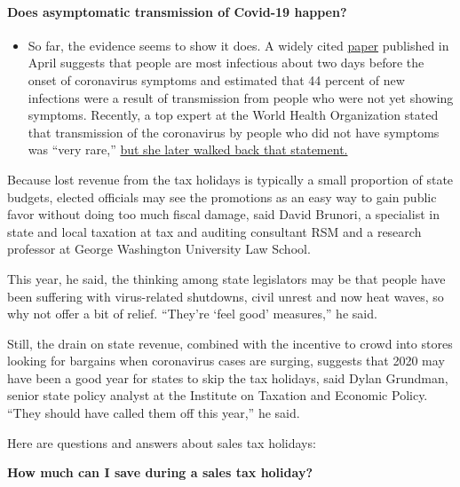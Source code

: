 \begin{itemize}
{  \paragraph{Does asymptomatic transmission of Covid-19
  happen?}\label{does-asymptomatic-transmission-of-covid-19-happen}}

  \begin{itemize}
  \tightlist
  \item
    So far, the evidence seems to show it does. A widely cited
    \href{https://www.nature.com/articles/s41591-020-0869-5}{paper}
    published in April suggests that people are most infectious about
    two days before the onset of coronavirus symptoms and estimated that
    44 percent of new infections were a result of transmission from
    people who were not yet showing symptoms. Recently, a top expert at
    the World Health Organization stated that transmission of the
    coronavirus by people who did not have symptoms was ``very rare,''
    \href{https://www.nytimes.com/2020/06/09/world/coronavirus-updates.html?action=click\&pgtype=Article\&state=default\&region=MAIN_CONTENT_3\&context=storylines_faq\#link-1f302e21}{but
    she later walked back that statement.}
  \end{itemize}
\end{itemize}

Because lost revenue from the tax holidays is typically a small
proportion of state budgets, elected officials may see the promotions as
an easy way to gain public favor without doing too much fiscal damage,
said David Brunori, a specialist in state and local taxation at tax and
auditing consultant RSM and a research professor at George Washington
University Law School.

This year, he said, the thinking among state legislators may be that
people have been suffering with virus-related shutdowns, civil unrest
and now heat waves, so why not offer a bit of relief. ``They're `feel
good' measures,'' he said.

Still, the drain on state revenue, combined with the incentive to crowd
into stores looking for bargains when coronavirus cases are surging,
suggests that 2020 may have been a good year for states to skip the tax
holidays, said Dylan Grundman, senior state policy analyst at the
Institute on Taxation and Economic Policy. ``They should have called
them off this year,'' he said.

Here are questions and answers about sales tax holidays:

\textbf{How much can I save during a sales tax holiday?}

